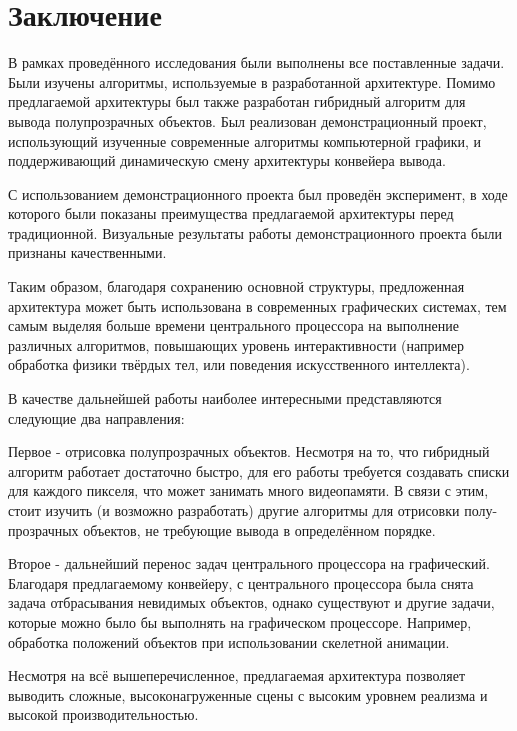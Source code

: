 \chapter*{Заключение} \label{ch-conclusion}
	В рамках проведённого исследования были выполнены все поставленные задачи. Были изучены алгоритмы, используемые в разработанной архитектуре. Помимо предлагаемой архитектуры был также разработан гибридный алгоритм для вывода полупрозрачных объектов. Был реализован демонстрационный проект, использующий изученные современные алгоритмы компьютерной графики, и поддерживающий динамическую смену архитектуры конвейера вывода.
	
	С использованием демонстрационного проекта был проведён эксперимент, в ходе которого были показаны преимущества предлагаемой архитектуры перед традиционной. Визуальные результаты работы демонстрационного проекта были признаны качественными.
	
	Таким образом, благодаря сохранению основной структуры, предложенная архитектура может быть использована в современных графических системах, тем самым выделяя больше времени центрального процессора на выполнение различных алгоритмов, повышающих уровень интерактивности (например обработка физики твёрдых тел, или поведения искусственного интеллекта).
	
	В качестве дальнейшей работы наиболее интересными представляются следующие два направления:
	
	Первое - отрисовка полупрозрачных объектов. Несмотря на то, что гибридный алгоритм работает достаточно быстро, для его работы требуется создавать списки для каждого пикселя, что может занимать много видеопамяти. В связи с этим, стоит изучить (и возможно разработать) другие алгоритмы для отрисовки полу-прозрачных объектов, не требующие вывода в определённом порядке.

	Второе - дальнейший перенос задач центрального процессора на графический. Благодаря предлагаемому конвейеру, с центрального процессора была снята задача отбрасывания невидимых объектов, однако существуют и другие задачи, которые можно было бы выполнять на графическом процессоре. Например, обработка положений объектов при использовании скелетной анимации.
	
	Несмотря на всё вышеперечисленное, предлагаемая архитектура позволяет выводить сложные, высоконагруженные сцены с высоким уровнем реализма и высокой производительностью.